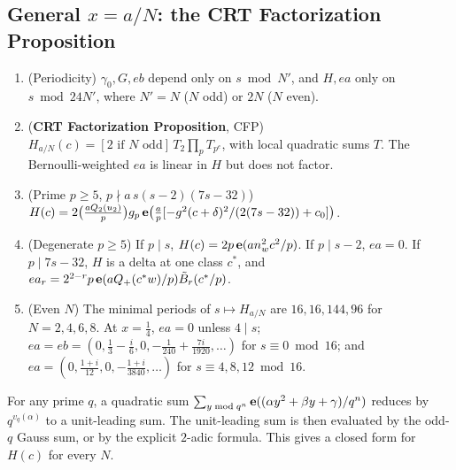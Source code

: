 \subsection{General $x=a/N$: the CRT Factorization Proposition}\label{sec:cfp}
\begin{proposition}[General $x=a/N$]\label{prop:crt6}
\begin{enumerate}[label=(\roman*)]
\item (Periodicity) $\gamma_0,G,eb$ depend only on $s\bmod N'$, and $H,ea$ only on $s\bmod24N'$, where $N'=N$ ($N$ odd) or $2N$ ($N$ even).
\item (\textbf{CRT Factorization Proposition}, CFP) $H_{a/N}(c)=[2\text{ if $N$ odd}]\,T_2\prod_pT_{p^e}$, with local quadratic sums $T$. The Bernoulli-weighted $ea$ is linear in $H$ but does not factor.
\item (Prime $p\ge5$, $p\nmid a\,s(s-2)(7s-32)$) $H(c)=2\big(\tfrac{aQ_2(u_2)}p\big)g_p\,\mathbf{e}\big(\tfrac ap[-g^2(c+\delta)^2/(2(7s-32))+c_0]\big)$.
\item (Degenerate $p\ge5$) If $p\mid s$, $H(c)=2p\,\mathbf{e}(an_w^2c^2/p)$. If $p\mid s-2$, $ea=0$. If $p\mid7s-32$, $H$ is a delta at one class $c^*$, and $ea_r=2^{2-r}p\,\mathbf{e}(aQ_+(c^*w)/p)\tilde B_r(c^*/p)$.
\item (Even $N$) The minimal periods of $s\mapsto H_{a/N}$ are $16,16,144,96$ for $N=2,4,6,8$. At $x=\tfrac14$, $ea=0$ unless $4\mid s$; $ea=eb=(0,\tfrac13-\tfrac i6,0,-\tfrac1{240}+\tfrac{7i}{1920},\dots)$ for $s\equiv0\bmod16$; and $ea=(0,\tfrac{1+i}{12},0,-\tfrac{1+i}{3840},\dots)$ for $s\equiv4,8,12\bmod16$.
\end{enumerate}
\end{proposition}
\begin{lemma}\label{lem:qred6}
For any prime $q$, a quadratic sum $\sum_{y\bmod q^n}\mathbf{e}((\alpha y^2+\beta y+\gamma)/q^n)$ reduces by $q^{v_q(\alpha)}$ to a unit-leading sum. The unit-leading sum is then evaluated by the odd-$q$ Gauss sum, or by the explicit $2$-adic formula. This gives a closed form for $H(c)$ for every $N$.
\end{lemma}
